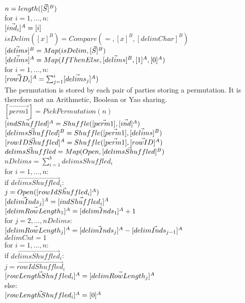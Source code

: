 \begin{protocol}
	$n = length([\vec{S}]^B)$ \\
	for $i = 1, \ldots, n$: \\
	\indent $[\vec{ind_i}]^A = [i]$ \\
	$isDelim([x]^B) = Compare(=, [x]^B , [delimChar]^B)$ \\
	$[\vec{delims}]^B = Map(isDelim, [\vec{S}]^B)$ \\
	$[\vec{delims}]^A = Map(IfThenElse, [\vec{delims}]^B, [1]^A, [0]^A)$\\
	for $i = 1, \ldots, n$: \\
	\indent $[\vec{rowID_i}]^A = \sum_{j=1}^i [\vec{delims_j}]^A)$ \\

	The permutation is stored by each pair of parties storing a permutation.
	It is therefore not an Arithmetic, Boolean or Yao sharing.\\
	$[\vec{perm1}] = PickPermutation(n)$ \\
	$[\vec{indShuffled}]^A = Shuffle([\vec{perm1}], [\vec{ind}]^A)$ \\
	$[\vec{delimsShuffled}]^B = Shuffle([\vec{perm1}], [\vec{delims}]^B)$ \\
	$[\vec{rowIDShuffled}]^A = Shuffle([\vec{perm1}], [\vec{rowID}]^A)$ \\
	$\vec{delimsShuffled} = Map(Open, [\vec{delimsShuffled}]^B)$ \\
	$nDelims = \sum_{i=1}^b delimsShuffled_i$ \\
	for $i = 1, \ldots, n$: \\
	\indent	if $\vec{delimsShuffled}_i$: \\
	\indent \indent $j = Open([\vec{rowIdShuffled_i}]^A)$ \\
	\indent \indent $[\vec{delimInds_j}]^A = [\vec{indShuffled_i}]^A$ \\
	$[\vec{delimRowLength_1}]^A = [\vec{delimInds_1}]^A + 1 $\\
	for $j = 2, \ldots, nDelims$: \\
	\indent $[\vec{delimRowLength_j}]^A = [\vec{delimInds_j}]^A - 
		[\vec{delimInds_{j-1}}]^A$ \\
	$delimCnt= 1$ \\
	for $i = 1, \ldots, n$: \\
	\indent if $\vec{delimsShuffled}_i$: \\
	\indent \indent $j = \vec{rowIdShuffled}_i$ \\
	\indent \indent $[\vec{rowLengthShuffled_i}]^A = [\vec{delimRowLength_j}]^A$ \\
	\indent else: \\
	\indent \indent $[\vec{rowLengthShuffled_i}]^A = [0]^A $\\


\end{protocol}
